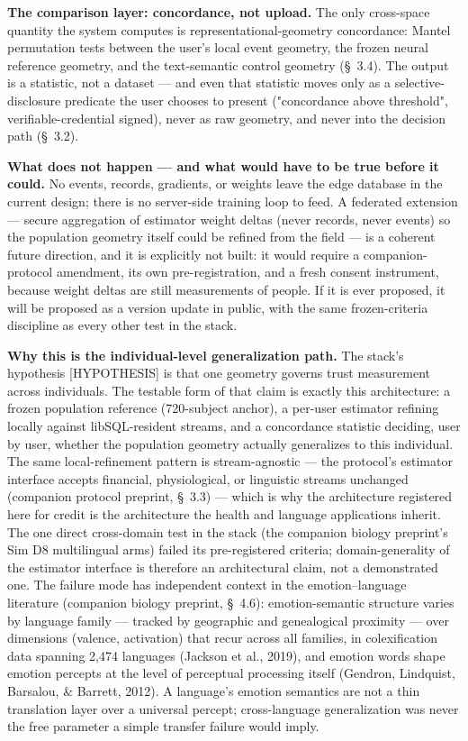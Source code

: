 \documentclass[11pt,twocolumn]{article}
\begin{document}
\textbf{The comparison layer: concordance, not upload.} The only cross-space quantity the system computes is representational-geometry concordance: Mantel permutation tests between the user's local event geometry, the frozen neural reference geometry, and the text-semantic control geometry (\S~3.4). The output is a statistic, not a dataset --- and even that statistic moves only as a selective-disclosure predicate the user chooses to present ("concordance above threshold", verifiable-credential signed), never as raw geometry, and never into the decision path (\S~3.2).

\textbf{What does not happen --- and what would have to be true before it could.} No events, records, gradients, or weights leave the edge database in the current design; there is no server-side training loop to feed. A federated extension --- secure aggregation of estimator weight deltas (never records, never events) so the population geometry itself could be refined from the field --- is a coherent future direction, and it is explicitly not built: it would require a companion-protocol amendment, its own pre-registration, and a fresh consent instrument, because weight deltas are still measurements of people. If it is ever proposed, it will be proposed as a version update in public, with the same frozen-criteria discipline as every other test in the stack.

\textbf{Why this is the individual-level generalization path.} The stack's hypothesis [HYPOTHESIS] is that one geometry governs trust measurement across individuals. The testable form of that claim is exactly this architecture: a frozen population reference (720-subject anchor), a per-user estimator refining locally against libSQL-resident streams, and a concordance statistic deciding, user by user, whether the population geometry actually generalizes to this individual. The same local-refinement pattern is stream-agnostic --- the protocol's estimator interface accepts financial, physiological, or linguistic streams unchanged (companion protocol preprint, \S~3.3) --- which is why the architecture registered here for credit is the architecture the health and language applications inherit. The one direct cross-domain test in the stack (the companion biology preprint's Sim D8 multilingual arms) failed its pre-registered criteria; domain-generality of the estimator interface is therefore an architectural claim, not a demonstrated one. The failure mode has independent context in the emotion--language literature (companion biology preprint, \S~4.6): emotion-semantic structure varies by language family --- tracked by geographic and genealogical proximity --- over dimensions (valence, activation) that recur across all families, in colexification data spanning 2,474 languages (Jackson et al., 2019), and emotion words shape emotion percepts at the level of perceptual processing itself (Gendron, Lindquist, Barsalou, \& Barrett, 2012). A language's emotion semantics are not a thin translation layer over a universal percept; cross-language generalization was never the free parameter a simple transfer failure would imply.
\end{document}
